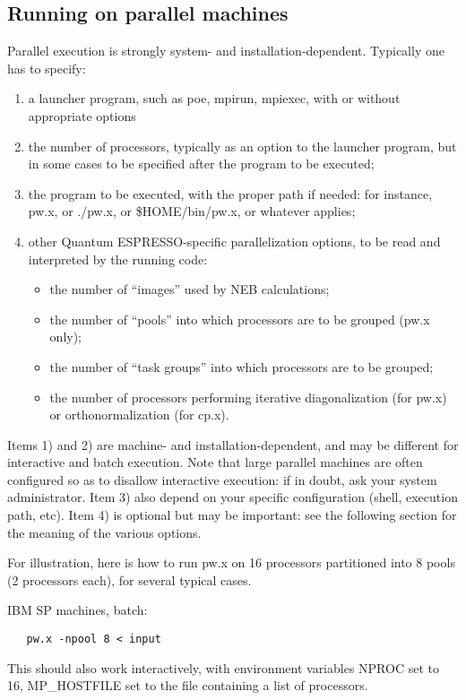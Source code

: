 \documentclass[12pt,a4paper]{article}
\def\qe{{\sc Quantum ESPRESSO}}
\begin{document}
\subsection{Running on parallel machines}

Parallel execution is strongly system- and installation-dependent. 
Typically one has to specify:
\begin{enumerate}
\item a launcher program, such as poe, mpirun, mpiexec, with or
  without  appropriate options 
\item the number of processors, typically as an option to the launcher
  program,  but in some cases to be specified after the program to be
  executed; 
\item the program to be executed, with the proper path if needed: for
  instance, pw.x, or ./pw.x, or \$HOME/bin/pw.x, or whatever applies; 
\item other \qe-specific parallelization options, to be
  read and interpreted by the running code: 
\begin{itemize}
\item the number of ``images'' used by NEB calculations;
\item the number of ``pools'' into which processors are to be grouped
  (pw.x only);
\item the number of ``task groups'' into which processors are to be
  grouped;
\item the number of processors performing iterative diagonalization
  (for pw.x) or orthonormalization (for cp.x).
\end{itemize}
\end{enumerate}
Items 1) and 2) are machine- and installation-dependent, and may be 
different for interactive and batch execution. Note that large
parallel machines are  often  configured so as to disallow interactive
execution: if in doubt, ask your system administrator.
Item 3) also depend on your specific configuration (shell, execution
path, etc). 
Item 4) is optional but may be important: see the following section
for the meaning of the various options.

For illustration, here is how to run pw.x on 16 processors partitioned into
8 pools (2 processors each), for several typical cases. 

IBM SP machines, batch:
\begin{verbatim}
   pw.x -npool 8 < input
\end{verbatim}
This should also work interactively, with environment variables NPROC
set to 16, MP\_HOSTFILE set to the file containing a list of processors.
\end{document}
